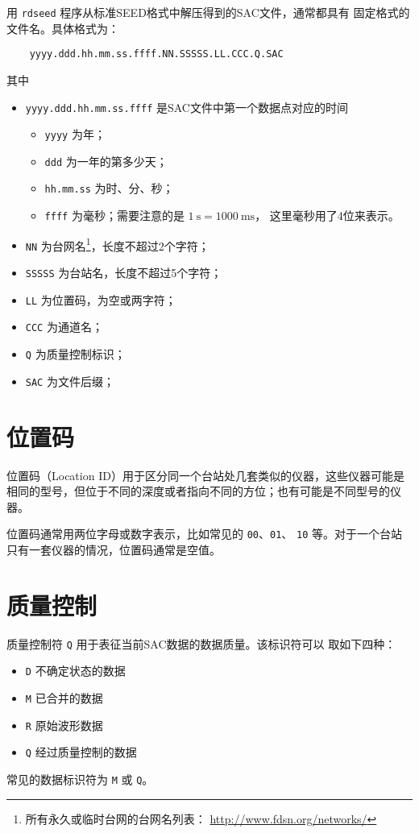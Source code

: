 用 \texttt{rdseed} 程序从标准SEED格式中解压得到的SAC文件，通常都具有
固定格式的文件名。具体格式为：
\begin{verbatim}
    yyyy.ddd.hh.mm.ss.ffff.NN.SSSSS.LL.CCC.Q.SAC
\end{verbatim}
其中
\begin{itemize}
\item \texttt{yyyy.ddd.hh.mm.ss.ffff} 是SAC文件中第一个数据点对应的时间
    \begin{itemize}
    \item \texttt{yyyy} 为年；
    \item \texttt{ddd} 为一年的第多少天；
    \item \texttt{hh.mm.ss} 为时、分、秒；
    \item \texttt{ffff} 为毫秒；需要注意的是 $\SI{1}{\s}=\SI{1000}{\ms}$，
        这里毫秒用了4位来表示。
    \end{itemize}
\item \texttt{NN} 为台网名\footnote{所有永久或临时台网的台网名列表：
    \url{http://www.fdsn.org/networks/}}，长度不超过2个字符；
\item \texttt{SSSSS} 为台站名，长度不超过5个字符；
\item \texttt{LL} 为位置码，为空或两字符；
\item \texttt{CCC} 为通道名；
\item \texttt{Q} 为质量控制标识；
\item \texttt{SAC} 为文件后缀；
\end{itemize}

\section{位置码}
位置码（Location ID）用于区分同一个台站处几套类似的仪器，这些仪器可能是
相同的型号，但位于不同的深度或者指向不同的方位；也有可能是不同型号的仪器。

位置码通常用两位字母或数字表示，比如常见的 \texttt{00}、\texttt{01}、
\texttt{10} 等。对于一个台站只有一套仪器的情况，位置码通常是空值。

\section{质量控制}
质量控制符 \texttt{Q} 用于表征当前SAC数据的数据质量。该标识符可以
取如下四种：
\begin{itemize}
\item \texttt{D} 不确定状态的数据
\item \texttt{M} 已合并的数据
\item \texttt{R} 原始波形数据
\item \texttt{Q} 经过质量控制的数据
\end{itemize}
常见的数据标识符为 \texttt{M} 或 \texttt{Q}。

